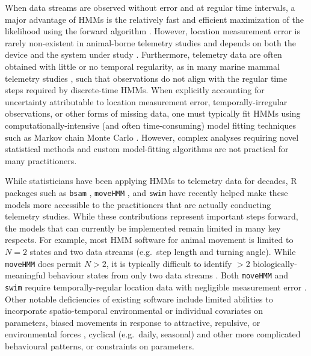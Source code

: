 \documentclass[12pt]{article}\usepackage[]{graphicx}\usepackage[]{color}
\begin{document}
When data streams are observed without error and at regular time intervals, a major advantage of HMMs is the relatively fast and efficient maximization of the likelihood using the forward algorithm \citep{ZucchiniEtAl2016}.  However, location measurement error is rarely non-existent in animal-borne telemetry studies and depends on both the device and the system under study \citep[e.g.][]{CostaEtAl2010}.  %
Furthermore, telemetry data are often obtained with little or no temporal regularity, as in many marine mammal telemetry studies \citep[e.g.][]{JonsenEtAl2005}, such that observations do not align with the regular time steps required by discrete-time HMMs. When explicitly accounting for uncertainty attributable to location measurement error, temporally-irregular observations, or other forms of missing data, one must typically fit HMMs using computationally-intensive (and often time-consuming) model fitting techniques such as Markov chain Monte Carlo \citep[e.g.][]{JonsenEtAl2005,McClintockEtAl2012}. However, complex analyses requiring novel statistical methods and custom model-fitting algorithms are not practical for many practitioners.

While statisticians have been applying HMMs to telemetry data for decades, R \citep{RCoreTeam2017} packages such as \verb|bsam| \citep{JonsenEtAl2005}, \verb|moveHMM| \citep{MichelotEtAl2016}, and \verb|swim| \citep{WhoriskeyEtAl2017} have recently helped make these models more accessible to the practitioners that are actually conducting telemetry studies. While these contributions represent important steps %
forward, the models that can currently be implemented remain limited in many key respects. For example, most HMM software for animal movement is limited to $N=2$ states and two data streams (e.g.\ step length and turning angle). While \verb|moveHMM| does permit $N>2$, it is typically difficult to identify $>$2 biologically-meaningful behaviour states from only two data streams \citep[e.g.][]{MoralesEtAl2004,BeyerEtAl2013,McClintockEtAl2014b}. Both \verb|moveHMM| and \verb|swim| require temporally-regular location data with negligible measurement error%
. Other notable deficiencies of existing software include limited abilities to incorporate spatio-temporal environmental or individual covariates on parameters, biased movements in response to attractive, repulsive, or environmental forces \citep[e.g.][]{McClintockEtAl2012,LangrockEtAl2014}, cyclical (e.g.\ daily, seasonal) and other more complicated behavioural patterns, or constraints on parameters. %
\end{document}
